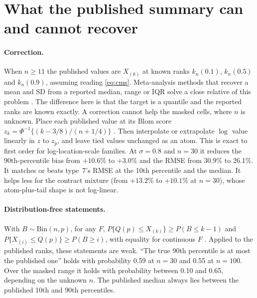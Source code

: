 \documentclass[11pt]{article}
\theoremstyle{remark}
\begin{document}
\section{What the published summary can and cannot recover}\label{sec:recover}

\paragraph{Correction.} When $n\ge11$ the published values are $X_{(k)}$ at known ranks $k_n(0.1)$, $k_n(0.5)$ and $k_n(0.9)$, assuming reading \eqref{eq:cms}. Meta-analysis methods that recover a mean and SD from a reported median, range or IQR solve a close relative of this problem \citep{hozo2005,wan2014,luo2018,mcgrath2020}. The difference here is that the target is a quantile and the reported ranks are known exactly. A correction cannot help the masked cells, where $n$ is unknown. Place each published value at its Blom score $z_k=\Phi^{-1}\{(k-3/8)/(n+1/4)\}$ \citep{blom1958}. Then interpolate or extrapolate $\log$ value linearly in $z$ to $z_p$, and leave tied values unchanged as an atom. This is exact to first order for log-location-scale families. At $\sigma=0.8$ and $n=30$ it reduces the 90th-percentile bias from $+10.6\%$ to $+3.0\%$ and the RMSE from 30.9\% to 26.1\%. It matches or beats type~7's RMSE at the 10th percentile and the median. It helps less for the contract mixture (from $+13.2\%$ to $+10.1\%$ at $n=30$), whose atom-plus-tail shape is not log-linear.

\paragraph{Distribution-free statements.} With $B\sim\mathrm{Bin}(n,p)$, for any $F$, $P\{Q(p)\le X_{(k)}\}\ge P(B\le k-1)$ and $P\{X_{(i)}\le Q(p)\}\ge P(B\ge i)$, with equality for continuous $F$ \citep{davidnagaraja2003}. Applied to the published ranks, these statements are weak. ``The true 90th percentile is at most the published one'' holds with probability 0.59 at $n=30$ and 0.55 at $n=100$. Over the masked range it holds with probability between 0.10 and 0.65, depending on the unknown $n$. The published median always lies between the published 10th and 90th percentiles.
\end{document}
